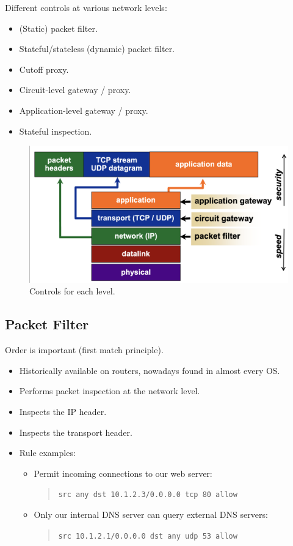 \noindent Different controls at various network levels:
\begin{itemize}
    \item (Static) packet filter.
    \item Stateful/stateless (dynamic) packet filter.
    \item Cutoff proxy.
    \item Circuit-level gateway / proxy.
    \item Application-level gateway / proxy.
    \item Stateful inspection.
\end{itemize}

\begin{figure}[H]
  \includegraphics[width=\linewidth]{Images/Firewalling/levels.png}
  \caption{Controls for each level.}
\end{figure}

\subsection{Packet Filter}
\begin{tcolorbox}[colback=red!10!white, colframe=red!70!black, coltitle=white, title=Beware]
    Order is important (first match principle).
\end{tcolorbox}
\begin{itemize}
    \item Historically available on routers, nowadays found in almost every OS.
    \item Performs packet inspection at the network level.
    \item Inspects the IP header.
    \item Inspects the transport header.
    \item Rule examples:
    \begin{itemize}
        \item Permit incoming connections to our web server:
        \begin{quote}
            \texttt{src any dst 10.1.2.3/0.0.0.0 tcp 80 allow}
        \end{quote}
        \item Only our internal DNS server can query external DNS servers:
        \begin{quote}
            \texttt{src 10.1.2.1/0.0.0.0 dst any udp 53 allow}
        \end{quote}
    \end{itemize}
\end{itemize}

